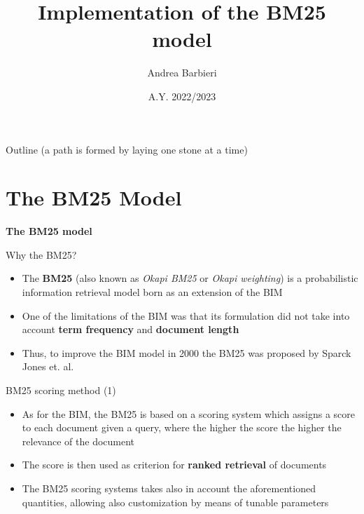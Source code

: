 \documentclass[]{beamer}
\title{Implementation of the BM25 model}
\author[A. Barbieri]{Andrea Barbieri}
\institute[UNITS]
{
      Data Science and Scientific computing - University of Trieste\\
      Information Retrieval Final Project
}
\date{A.Y. 2022/2023}
\begin{document}
\begin{frame}[plain]
    \titlepage
\end{frame}

\begin{frame}{Outline \footnotesize{(a path is formed by laying one stone at a time)}}
    \tableofcontents
\end{frame}

\section{The BM25 Model}
\begin{frame}
    \begin{block}{}
        \centering
        \huge{\textbf{The BM25 model}}
    \end{block}
\end{frame}
\begin{frame}{Why the BM25?}
    \begin{itemize}
        \item The \textbf{BM25} (also known as \textit{Okapi BM25} or \textit{Okapi weighting}) is a probabilistic information retrieval model born as an extension of the BIM
        \item One of the limitations of the BIM was that its formulation did not take into account \textbf{term frequency} and \textbf{document length}
        \item Thus, to improve the BIM model in 2000 the BM25 was proposed by Sparck Jones et. al.
    \end{itemize}
    
\end{frame}
\begin{frame}{BM25 scoring method (1)}
    \begin{itemize}
        \item As for the BIM, the BM25 is based on a scoring system which assigns a score to each document given a query,
                where the higher the score the higher the relevance of the document
        \item The score is then used as criterion for \textbf{ranked retrieval} of documents
        \item The BM25 scoring systems takes also in account the aforementioned quantities, allowing also 
                customization by means of tunable parameters   
    \end{itemize}
\end{frame}    
\end{document}
